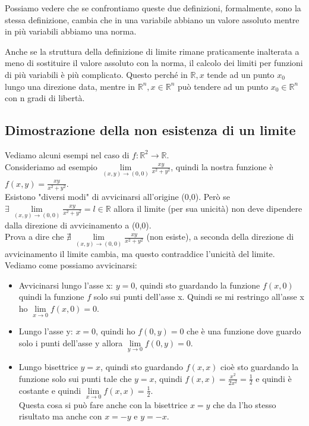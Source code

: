 Possiamo vedere che se confrontiamo queste due definizioni, formalmente, sono la stessa definizione, cambia che in una variabile abbiano un valore assoluto mentre in più variabili abbiamo una norma.

\begin{observation}
Anche se la struttura della definizione di limite rimane praticamente inalterata a meno di sostituire il valore assoluto con la norma, il calcolo dei limiti per funzioni di più variabili è più complicato. Questo perché in $\mathbb{R}, x$ tende ad un punto $x_0$ lungo una direzione data, mentre in $\mathbb{R}^n, x\in \mathbb{R}^n$ può tendere ad un punto $x_0 \in \mathbb{R}^n$ con n gradi di libertà.
\end{observation}

\subsection{Dimostrazione della non esistenza di un limite}
\begin{example}
Vediamo alcuni esempi nel caso di $f: \mathbb{R}^2 \to \mathbb{R}$.\\
Consideriamo ad esempio $\lim\limits_{(x,y) \to (0,0)}\frac{xy}{x^2 + y^2}$, quindi la nostra funzione è $f(x,y) = \frac{xy}{x^2 + y^2}$.\\
Esistono "diversi modi" di avvicinarsi all'origine (0,0). Però se $\exists\:\lim\limits_{(x,y) \to (0,0)}\frac{xy}{x^2 + y^2} = l \in \mathbb{R}$ allora il limite (per sua unicità) non deve dipendere dalla direzione di avvicinamento a (0,0).\\
Prova a dire che $\nexists \:\lim\limits_{(x,y) \to (0,0)}\frac{xy}{x^2 + y^2}$ (non esiste), a seconda della direzione di avvicinamento il limite cambia, ma questo contraddice l'unicità del limite. Vediamo come possiamo avvicinarsi:
\begin{itemize}
    \item Avvicinarsi lungo l'asse x: $y=0$, quindi sto guardando la funzione $f(x,0)$ quindi la funzione $f$ solo sui punti dell'asse x. Quindi se mi restringo all'asse x ho $\lim\limits_{x\to 0}f(x,0) = 0$.
    \item Lungo l'asse y: $x=0$, quindi ho $f(0,y) = 0$ che è una funzione dove guardo solo i punti dell'asse y allora $\lim\limits_{y \to 0}f(0,y) = 0$.
    \item Lungo bisettrice $y=x$, quindi sto guardando $f(x,x)$ cioè sto guardando la funzione solo sui punti tale che $y=x$, quindi $f(x,x) = \frac{x^2}{2x^2} = \frac{1}{2}$ e quindi è costante e quindi $\lim\limits_{x\to 0}f(x,x) = \frac{1}{2}$.\\
    Questa cosa si può fare anche con la bisettrice $x = y$ che da l'ho stesso risultato ma anche con $x = -y$ e $y = -x$.
\end{itemize}
\end{example}
